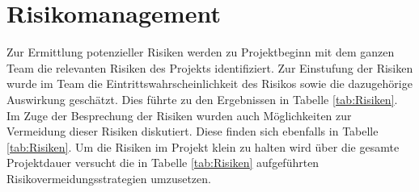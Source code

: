 \chapter{Risikomanagement}
Zur Ermittlung potenzieller Risiken werden zu Projektbeginn mit dem ganzen Team die relevanten Risiken des Projekts identifiziert. Zur Einstufung der Risiken wurde im Team die Eintrittswahrscheinlichkeit des Risikos sowie die dazugehörige Auswirkung geschätzt. Dies führte zu den Ergebnissen in Tabelle \ref{tab:Risiken}. Im Zuge der Besprechung der Risiken wurden auch Möglichkeiten zur Vermeidung dieser Risiken diskutiert. Diese finden sich ebenfalls in Tabelle \ref{tab:Risiken}. Um die Risiken im Projekt klein zu halten wird über die gesamte Projektdauer versucht die in Tabelle \ref{tab:Risiken} aufgeführten Risikovermeidungsstrategien umzusetzen.\\

